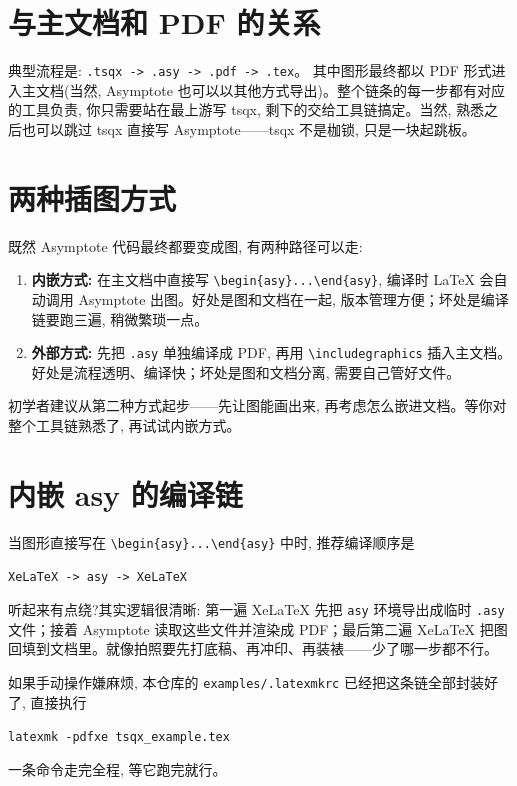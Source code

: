 \documentclass[11pt,oneside]{ctexbook}
\begin{document}
\section{与主文档和 PDF 的关系}
典型流程是: \texttt{.tsqx -> .asy -> .pdf -> .tex}。
其中图形最终都以 PDF 形式进入主文档(当然, Asymptote 也可以以其他方式导出)。整个链条的每一步都有对应的工具负责, 你只需要站在最上游写 tsqx, 剩下的交给工具链搞定。当然, 熟悉之后也可以跳过 tsqx 直接写 Asymptote——tsqx 不是枷锁, 只是一块起跳板。

\section{两种插图方式}
既然 Asymptote 代码最终都要变成图, 有两种路径可以走:
\begin{enumerate}
	\item \textbf{内嵌方式: }在主文档中直接写 \texttt{\textbackslash begin\{asy\}...\textbackslash end\{asy\}}, 编译时 LaTeX 会自动调用 Asymptote 出图。好处是图和文档在一起, 版本管理方便；坏处是编译链要跑三遍, 稍微繁琐一点。
	\item \textbf{外部方式: }先把 \texttt{.asy} 单独编译成 PDF, 再用 \texttt{\textbackslash includegraphics} 插入主文档。好处是流程透明、编译快；坏处是图和文档分离, 需要自己管好文件。
\end{enumerate}
初学者建议从第二种方式起步——先让图能画出来, 再考虑怎么嵌进文档。等你对整个工具链熟悉了, 再试试内嵌方式。

\section{内嵌 asy 的编译链}
当图形直接写在 \texttt{\textbackslash begin\{asy\}...\textbackslash end\{asy\}} 中时,
推荐编译顺序是
\begin{center}
	\texttt{XeLaTeX -> asy -> XeLaTeX}
\end{center}

听起来有点绕?其实逻辑很清晰: 第一遍 XeLaTeX 先把 \texttt{asy} 环境导出成临时 \texttt{.asy} 文件；接着 Asymptote 读取这些文件并渲染成 PDF；最后第二遍 XeLaTeX 把图回填到文档里。就像拍照要先打底稿、再冲印、再装裱——少了哪一步都不行。

如果手动操作嫌麻烦, 本仓库的 \texttt{examples/.latexmkrc} 已经把这条链全部封装好了, 直接执行

\begin{center}
	\texttt{latexmk -pdfxe tsqx\_example.tex}
\end{center}
一条命令走完全程, 等它跑完就行。
\end{document}
